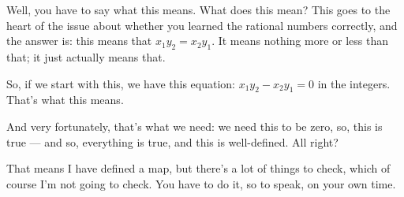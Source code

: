 \begin{speech}[00:27:52 - 00:28:48]
Well, you have to say what this means. What does this mean? This goes to the heart of the issue about whether you learned the rational numbers correctly, and the answer is: this means  that $x_1 y_2 = x_2 y_1$. It means nothing more or less than that; it just actually means that.

So, if we start with this, we have this equation:  $x_1 y_2 - x_2 y_1 = 0$ in the integers. That's what this means.

And very fortunately, that's what we need: we need this to be zero, so, this is true  --- and so, everything is true, and this is well-defined. All right?

That means I have defined a map, but there's a lot of things to check, which of course I'm not going to check. You have to do it, so to speak, on your own time.
\end{speech}

